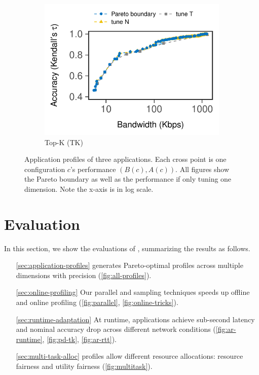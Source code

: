 \begin{figure}[htb]
\begin{subfigure}[t]{0.32\textwidth}
    \centering
    \includegraphics[width=\textwidth]{figures/profile-topk.pdf}
    \caption{Top-K (TK)}
    \label{fig:tk-profile}
  \end{subfigure}
  \caption{Application profiles of three applications. Each cross point is one
    configuration $c$'s performance $(B(c), A(c))$. All figures show the Pareto
    boundary as well as the performance if only tuning one dimension. Note the
    x-axis is in log scale.}
  \label{fig:all-profiles}
  \vspace{-1em}
\end{figure}

\section{Evaluation}
\label{sec:evaluation}

In this section, we show the evaluations of \sysname{}, summarizing the results
as follows.

\begin{itemize}[itemsep=0pt, topsep=3pt]
\item[\autoref{sec:application-profiles}] \sysname{} generates Pareto-optimal
  profiles across multiple dimensions with precision
  (\autoref{fig:all-profiles}).
\item[\autoref{sec:online-profiling}] Our parallel and sampling techniques
  speeds up offline and online profiling (\autoref{fig:parallel},
  \autoref{fig:online-tricks}).
\item[\autoref{sec:runtime-adaptation}] At runtime, \sysname{} applications
  achieve sub-second latency and nominal accuracy drop across different network
  conditions (\autoref{fig:ar-runtime}, \autoref{fig:pd-tk},
  \autoref{fig:ar-rtt}).
\item[\autoref{sec:multi-task-alloc}] \sysname{} profiles allow different
  resource allocations: resource fairness and utility fairness
  (\autoref{fig:multitask}).
\end{itemize}

